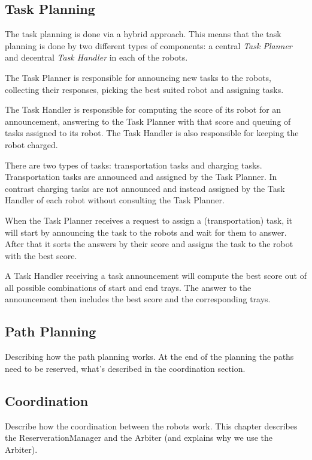 \documentclass[journal]{IEEEtran}
\begin{document}
\subsection{Task Planning}
\label{subsec:task_planning}
The task planning is done via a hybrid approach. This means that the task planning is done by two different types of components: a central \textit{Task Planner} and decentral \textit{Task Handler} in each of the robots.

The Task Planner is responsible for announcing new tasks to the robots, collecting their responses, picking the best suited robot and assigning tasks.

The Task Handler is responsible for computing the score of its robot for an announcement, answering to the Task Planner with that score and queuing of tasks assigned to its robot. The Task Handler is also responsible for keeping the robot charged.

There are two types of tasks: transportation tasks and charging tasks. Transportation tasks are announced and assigned by the Task Planner. In contrast charging tasks are not announced and instead assigned by the Task Handler of each robot without consulting the Task Planner.

When the Task Planner receives a request to assign a (transportation) task, it will start by announcing the task to the robots and wait for them to answer. After that it sorts the answers by their score and assigns the task to the robot with the best score.

A Task Handler receiving a task announcement will compute the best score out of all possible combinations of start and end trays. The answer to the announcement then includes the best score and the corresponding trays.


\subsection{Path Planning}
\label{subsec:path_planning}
Describing how the path planning works. At the end of the planning the paths need to be reserved, what's described in the coordination section.

\subsection{Coordination}
\label{subsec:coordination}
Describe how the coordination between the robots work. This chapter describes the ReserverationManager and the Arbiter (and explains why we use the Arbiter).
\end{document}
